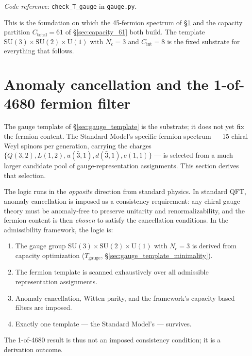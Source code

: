 \documentclass[11pt]{article}
\newcommand{\coderef}[2]{\smallskip\noindent\textit{Code reference:} \texttt{#1} in \texttt{#2}.}
\newcommand{\SU}{\mathrm{SU}}
\newcommand{\Un}{\mathrm{U}}
\theoremstyle{definition}
\begin{document}
\coderef{check\_T\_gauge}{gauge.py}

This is the foundation on which the 45-fermion spectrum of \S\ref{sec:anomaly_4680} and the capacity partition $C_{\mathrm{total}} = 61$ of \S\ref{sec:capacity_61} both build. The template $\SU(3)\times\SU(2)\times\Un(1)$ with $N_c = 3$ and $C_{\mathrm{int}} = 8$ is the fixed substrate for everything that follows.

\section{Anomaly cancellation and the 1-of-4680 fermion filter}\label{sec:anomaly_4680}

The gauge template of \S\ref{sec:gauge_template} is the substrate; it does not yet fix the fermion content. The Standard Model's specific fermion spectrum --- 15 chiral Weyl spinors per generation, carrying the charges $\{Q(3,2), L(1,2), u(\bar 3, 1), d(\bar 3, 1), e(1,1)\}$ --- is selected from a much larger candidate pool of gauge-representation assignments. This section derives that selection.

The logic runs in the \emph{opposite} direction from standard physics. In standard QFT, anomaly cancellation is imposed as a consistency requirement: any chiral gauge theory must be anomaly-free to preserve unitarity and renormalizability, and the fermion content is then \emph{chosen} to satisfy the cancellation conditions. In the admissibility framework, the logic is:

\begin{enumerate}
    \item The gauge group $\SU(3)\times\SU(2)\times\Un(1)$ with $N_c = 3$ is derived from capacity optimization ($T_{\mathrm{gauge}}$, \S\ref{sec:gauge_template_minimality}).
    \item The fermion template is scanned exhaustively over all admissible representation assignments.
    \item Anomaly cancellation, Witten parity, and the framework's capacity-based filters are imposed.
    \item Exactly one template --- the Standard Model's --- survives.
\end{enumerate}

The 1-of-4680 result is thus not an imposed consistency condition; it is a derivation outcome.
\end{document}
